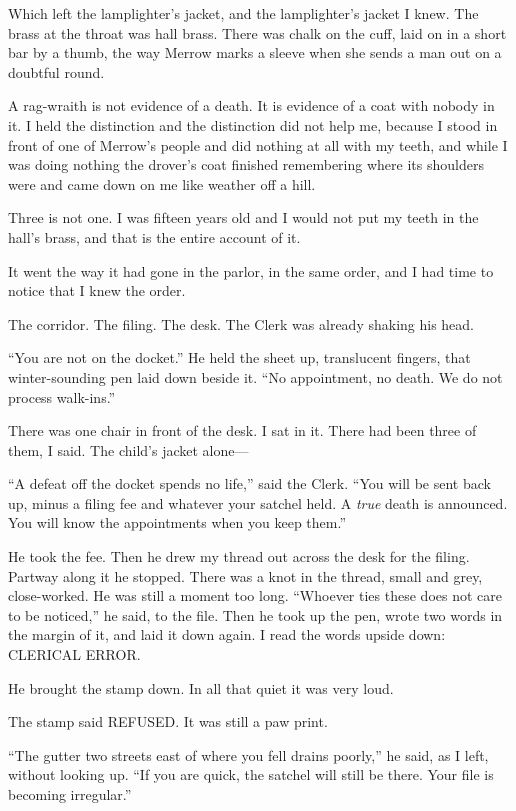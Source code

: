 Which left the lamplighter's jacket, and the lamplighter's jacket I knew. The brass at the throat was hall brass. There was chalk on the cuff, laid on in a short bar by a thumb, the way Merrow marks a sleeve when she sends a man out on a doubtful round.

A rag-wraith is not evidence of a death. It is evidence of a coat with nobody in it. I held the distinction and the distinction did not help me, because I stood in front of one of Merrow's people and did nothing at all with my teeth, and while I was doing nothing the drover's coat finished remembering where its shoulders were and came down on me like weather off a hill.

Three is not one. I was fifteen years old and I would not put my teeth in the hall's brass, and that is the entire account of it.

It went the way it had gone in the parlor, in the same order, and I had time to notice that I knew the order.

The corridor. The filing. The desk. The Clerk was already shaking his head.

``You are not on the docket.'' He held the sheet up, translucent fingers, that winter-sounding pen laid down beside it. ``No appointment, no death. We do not process walk-ins.''

There was one chair in front of the desk. I sat in it. There had been three of them, I said. The child's jacket alone---

``A defeat off the docket spends no life,'' said the Clerk. ``You will be sent back up, minus a filing fee and whatever your satchel held. A \emph{true} death is announced. You will know the appointments when you keep them.''

He took the fee. Then he drew my thread out across the desk for the filing. Partway along it he stopped. There was a knot in the thread, small and grey, close-worked. He was still a moment too long. ``Whoever ties these does not care to be noticed,'' he said, to the file. Then he took up the pen, wrote two words in the margin of it, and laid it down again. I read the words upside down: CLERICAL ERROR.

He brought the stamp down. In all that quiet it was very loud.

The stamp said REFUSED. It was still a paw print.

``The gutter two streets east of where you fell drains poorly,'' he said, as I left, without looking up. ``If you are quick, the satchel will still be there. Your file is becoming irregular.''

